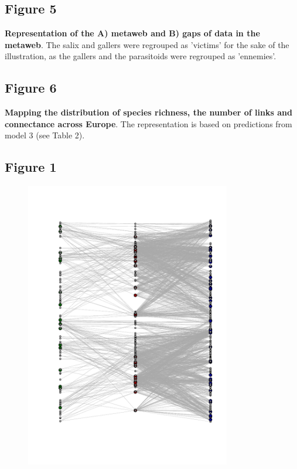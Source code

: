 \documentclass[12pt]{article}
\begin{document}
\subsection*{Figure 5}
\textbf{Representation of the A) metaweb and B) gaps of data in the metaweb}. The salix and gallers were regrouped as 'victims' for the sake of the illustration, as the gallers and the parasitoids were regrouped as 'ennemies'. 

\subsection*{Figure 6}
\textbf{Mapping the distribution of species richness, the number of links and connectance across Europe}. The representation is based on predictions from model 3 (see Table 2).  

\newpage


\subsection*{Figure 1}

\begin{figure}[ht!]
\centering\includegraphics[width=0.8\textwidth]{figures/mw_sampling}
\end{figure}
\end{document}
